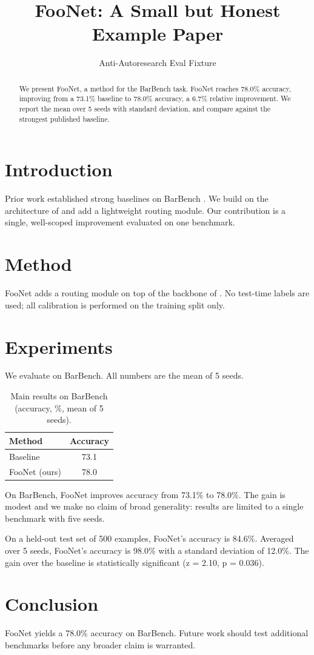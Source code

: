 \documentclass{article}
\title{FooNet: A Small but Honest Example Paper}
\author{Anti-Autoresearch Eval Fixture}
\begin{document}
\maketitle

\begin{abstract}
We present FooNet, a method for the BarBench task. FooNet reaches
78.0\% accuracy, improving from a 73.1\% baseline to 78.0\% accuracy,
a 6.7\% relative improvement. We report the mean over 5 seeds with
standard deviation, and compare against the strongest published baseline.
\end{abstract}

\section{Introduction}
Prior work established strong baselines on BarBench \cite{smith2024bar}.
We build on the architecture of \cite{lee2023foundations} and add a
lightweight routing module. Our contribution is a single, well-scoped
improvement evaluated on one benchmark.

\section{Method}
FooNet adds a routing module on top of the backbone of
\cite{lee2023foundations}. No test-time labels are used; all calibration
is performed on the training split only.

\section{Experiments}
We evaluate on BarBench. All numbers are the mean of 5 seeds.

\begin{table}[t]
\caption{Main results on BarBench (accuracy, \%, mean of 5 seeds).}
\begin{tabular}{lc}
\toprule
Method & Accuracy \\
\midrule
Baseline \cite{smith2024bar} & 73.1 \\
FooNet (ours) & 78.0 \\
\bottomrule
\end{tabular}
\end{table}

On BarBench, FooNet improves accuracy from 73.1\% to 78.0\%. The gain is
modest and we make no claim of broad generality: results are limited to a
single benchmark with five seeds.

On a held-out test set of 500 examples, FooNet's accuracy is 84.6\%.
Averaged over 5 seeds, FooNet's accuracy is 98.0\% with a standard
deviation of 12.0\%. The gain over the baseline is statistically
significant (z = 2.10, p = 0.036).

\section{Conclusion}
FooNet yields a 78.0\% accuracy on BarBench. Future work should test
additional benchmarks before any broader claim is warranted.
\end{document}
